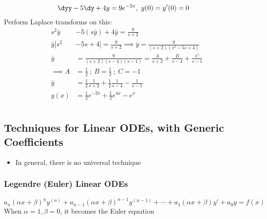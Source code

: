 \documentclass[Maths.tex]{subfiles}
\begin{document}
\begin{example}
\begin{align}
    \dyy &- 5\dy + 4y = 9e^{-2x}, ~ y(0) = y'(0) = 0
\end{align}
Perform Laplace transforms on this:
\begin{align}
    s^2 \bar{y} &- 5(s\bar{y}) + 4\bar{y} = \frac{9}{s + 2} \\
    \bar{y} [s^2 &- 5s + 4] = \frac{9}{s + 2} \implies \bar{y} = \frac{9}{(s + 2)(s^2 - 5s + 4)} \\
    \bar{y} &= \frac{9}{(s + 2)(s - 4)(s - 1)} = \frac{A}{s + 2} + \frac{B}{s - 4} + \frac{C}{s - 1} \\
    \implies A &= \frac{1}{2} ~;~ B = \frac{1}{2} ~;~ C = -1 \\
    \bar{y} &= \frac{1}{2}\frac{1}{s + 2} + \frac{1}{2}\frac{1}{s - 4} - \frac{1}{s - 1} \\
    y(x) &= \frac{1}{2}e^{-2x} + \frac{1}{2}e^{4x} - e^x
\end{align}
\end{example}

\chapter{}
\section{Techniques for Linear ODEs, with Generic Coefficients}
\begin{itemize}
    \item In general, there is no universal technique
\end{itemize}

\subsection{Legendre (Euler) Linear ODEs}
\begin{equation}
    a_n(\alpha x + \beta)^n y^{(n)} + a_{n - 1}(\alpha x + \beta)^{n-1}y^{(n-1)} + \cdots + a_1(\alpha x + \beta)y' + a_0y = f(x) \tag{Legendre}
\end{equation}
When $\alpha = 1, \beta = 0$, it becomes the Euler equation
\end{document}
